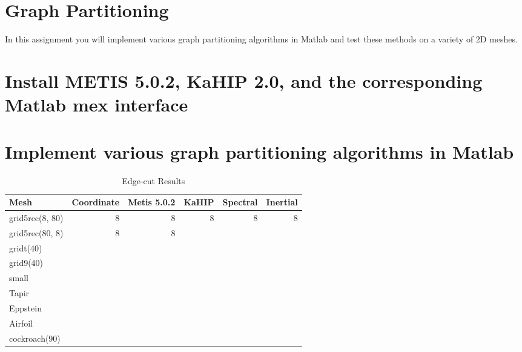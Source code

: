 \documentclass[unicode,11pt,a4paper,oneside,numbers=endperiod,openany]{scrartcl}
\begin{document}
\setassignment
{}

\newline

\section*{Graph Partitioning}
In this assignment  you will implement various graph partitioning algorithms in Matlab and test these methods on a variety of 2D meshes.



\section{Install METIS 5.0.2, KaHIP  2.0, and the corresponding Matlab mex interface }
\section{Implement various graph partitioning algorithms in Matlab }
\begin{table}[h]
	\caption{Edge-cut Results}
	\centering
	\begin{tabular}{l|r|r|r|r|r} \hline\hline 
		Mesh             &  Coordinate           & Metis 5.0.2 &  KaHIP & Spectral & Inertial  \\ \hline
		grid5rec(8, 80)  &    8                   &  8         &   8       &   8      &   8        \\             
		grid5rec(80, 8)  &    8                   &  8         &           &          &           \\ 
		gridt(40)        &                        &            &           &          &           \\ 
		grid9(40)        &                        &            &           &          &           \\ 
		small            &                        &            &           &          &           \\
		Tapir            &                        &            &           &          &           \\ 
		Eppstein         &                        &            &           &          &           \\ 
		Airfoil          &                        &            &           &          &           \\ 
		cockroach(90)    &                        &            &           &          &           \\ \hline \hline
	\end{tabular}
	\label{table:edge}
\end{table}
\end{document}
